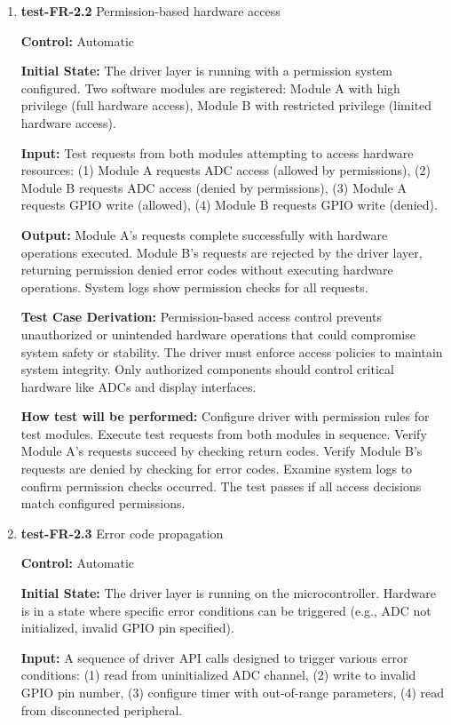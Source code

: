 \documentclass[12pt, titlepage]{article}
\begin{document}
\begin{enumerate}
\item{\textbf{test-FR-2.2} Permission-based hardware access\\}

\textbf{Control:} Automatic
					
\textbf{Initial State:} 
The driver layer is running with a permission system configured. Two software 
modules are registered: Module A with high privilege (full hardware access), 
Module B with restricted privilege (limited hardware access).
					
\textbf{Input:}
Test requests from both modules attempting to access hardware resources:
(1) Module A requests ADC access (allowed by permissions),
(2) Module B requests ADC access (denied by permissions),
(3) Module A requests GPIO write (allowed),
(4) Module B requests GPIO write (denied).
					
\textbf{Output:}
Module A's requests complete successfully with hardware operations executed. 
Module B's requests are rejected by the driver layer, returning permission 
denied error codes without executing hardware operations. System logs show 
permission checks for all requests.

\textbf{Test Case Derivation:} 
Permission-based access control prevents unauthorized or unintended hardware 
operations that could compromise system safety or stability. The driver must 
enforce access policies to maintain system integrity. Only authorized components 
should control critical hardware like ADCs and display interfaces.
					
\textbf{How test will be performed:}
Configure driver with permission rules for test modules. Execute test requests 
from both modules in sequence. Verify Module A's requests succeed by checking 
return codes. Verify Module B's requests are denied by checking for error codes. 
Examine system logs to confirm permission checks occurred. The test passes if 
all access decisions match configured permissions.

\item{\textbf{test-FR-2.3} Error code propagation\\}

\textbf{Control:} Automatic
					
\textbf{Initial State:} 
The driver layer is running on the microcontroller. Hardware is in a state 
where specific error conditions can be triggered (e.g., ADC not initialized, 
invalid GPIO pin specified).
					
\textbf{Input:}
A sequence of driver API calls designed to trigger various error conditions:
(1) read from uninitialized ADC channel,
(2) write to invalid GPIO pin number,
(3) configure timer with out-of-range parameters,
(4) read from disconnected peripheral.
					

\end{enumerate}
\end{document}
